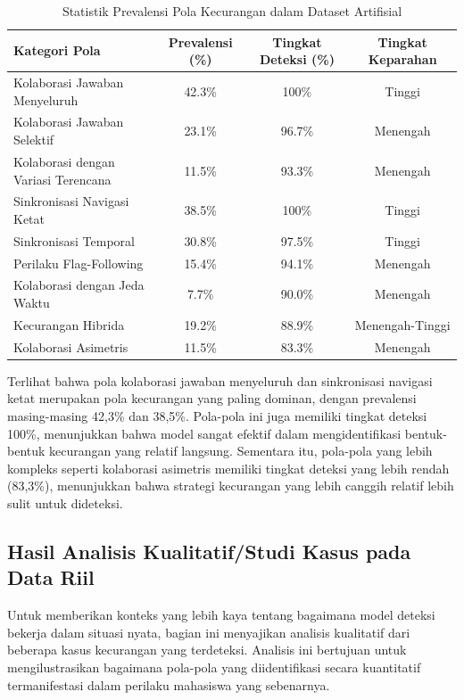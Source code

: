 \begin{table}[htbp]
\centering
\caption{Statistik Prevalensi Pola Kecurangan dalam Dataset Artifisial}
\label{tabel:statistikPolaCurang}
\begin{tabular}{|l|c|c|c|}
\hline
\textbf{Kategori Pola} & \textbf{Prevalensi (\%)} & \textbf{Tingkat Deteksi (\%)} & \textbf{Tingkat Keparahan} \\
\hline
Kolaborasi Jawaban Menyeluruh & 42.3\% & 100\% & Tinggi \\
\hline
Kolaborasi Jawaban Selektif & 23.1\% & 96.7\% & Menengah \\
\hline
Kolaborasi dengan Variasi Terencana & 11.5\% & 93.3\% & Menengah \\
\hline
Sinkronisasi Navigasi Ketat & 38.5\% & 100\% & Tinggi \\
\hline
Sinkronisasi Temporal & 30.8\% & 97.5\% & Tinggi \\
\hline
Perilaku Flag-Following & 15.4\% & 94.1\% & Menengah \\
\hline
Kolaborasi dengan Jeda Waktu & 7.7\% & 90.0\% & Menengah \\
\hline
Kecurangan Hibrida & 19.2\% & 88.9\% & Menengah-Tinggi \\
\hline
Kolaborasi Asimetris & 11.5\% & 83.3\% & Menengah \\
\hline
\end{tabular}
\end{table}

Terlihat bahwa pola kolaborasi jawaban menyeluruh dan sinkronisasi navigasi ketat merupakan pola kecurangan yang paling dominan, dengan prevalensi masing-masing 42,3\% dan 38,5\%. Pola-pola ini juga memiliki tingkat deteksi 100\%, menunjukkan bahwa model sangat efektif dalam mengidentifikasi bentuk-bentuk kecurangan yang relatif langsung. Sementara itu, pola-pola yang lebih kompleks seperti kolaborasi asimetris memiliki tingkat deteksi yang lebih rendah (83,3\%), menunjukkan bahwa strategi kecurangan yang lebih canggih relatif lebih sulit untuk dideteksi.

\subsection{Hasil Analisis Kualitatif/Studi Kasus pada Data Riil}
\label{subsec:analisisKualitatif}

Untuk memberikan konteks yang lebih kaya tentang bagaimana model deteksi bekerja dalam situasi nyata, bagian ini menyajikan analisis kualitatif dari beberapa kasus kecurangan yang terdeteksi. Analisis ini bertujuan untuk mengilustrasikan bagaimana pola-pola yang diidentifikasi secara kuantitatif termanifestasi dalam perilaku mahasiswa yang sebenarnya.

